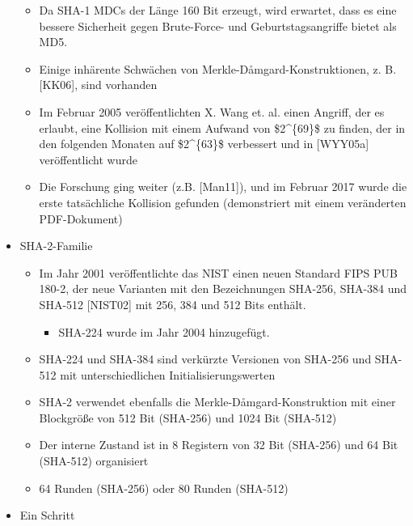 \documentclass[a4paper]{article}
\begin{document}
\begin{multicols}{3}
\begin{itemize}
              \begin{itemize}
                  \item
                        Da SHA-1 MDCs der Länge 160 Bit erzeugt, wird erwartet, dass es eine
                        bessere Sicherheit gegen Brute-Force- und Geburtstagsangriffe bietet
                        als MD5.
                  \item
                        Einige inhärente Schwächen von Merkle-Dåmgard-Konstruktionen, z. B.
                        {[}KK06{]}, sind vorhanden
                  \item
                        Im Februar 2005 veröffentlichten X. Wang et. al. einen Angriff, der
                        es erlaubt, eine Kollision mit einem Aufwand von \$2\^{}\{69\}\$ zu
                        finden, der in den folgenden Monaten auf \$2\^{}\{63\}\$ verbessert
                        und in {[}WYY05a{]} veröffentlicht wurde
                  \item
                        Die Forschung ging weiter (z.B. {[}Man11{]}), und im Februar 2017
                        wurde die erste tatsächliche Kollision gefunden (demonstriert mit
                        einem veränderten PDF-Dokument)
              \end{itemize}
        \item
              SHA-2-Familie

              \begin{itemize}
                  \item
                        Im Jahr 2001 veröffentlichte das NIST einen neuen Standard FIPS PUB
                        180-2, der neue Varianten mit den Bezeichnungen SHA-256, SHA-384 und
                        SHA-512 {[}NIST02{]} mit 256, 384 und 512 Bits enthält.

                        \begin{itemize}
                            \item
                                  SHA-224 wurde im Jahr 2004 hinzugefügt.
                        \end{itemize}
                  \item
                        SHA-224 und SHA-384 sind verkürzte Versionen von SHA-256 und SHA-512
                        mit unterschiedlichen Initialisierungswerten
                  \item
                        SHA-2 verwendet ebenfalls die Merkle-Dåmgard-Konstruktion mit einer
                        Blockgröße von 512 Bit (SHA-256) und 1024 Bit (SHA-512)
                  \item
                        Der interne Zustand ist in 8 Registern von 32 Bit (SHA-256) und 64
                        Bit (SHA-512) organisiert
                  \item
                        64 Runden (SHA-256) oder 80 Runden (SHA-512)
              \end{itemize}
        \item
              Ein Schritt


\end{itemize}
\end{multicols}
\end{document}
